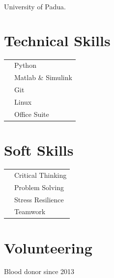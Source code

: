 \documentclass[a4paper, 12pt]{my_cv}
\newlength\MyColWidth
\newlength\SideWidth
\begin{document}
\begin{textblock*}{\SideWidth}
{    
    \raggedright University of Padua.
    
    }

\section*{Technical Skills}
    \begin{tabu} to 0.9
              & Python\\ 
              & Matlab \& Simulink\\ 
              & Git\\ 
              & Linux\\
              & Office Suite\\
    \end{tabu}

    \section*{Soft Skills}
    \begin{tabu} to 0.9
                  & Critical Thinking\\ 
              & Problem Solving\\
              & Stress Resilience\\
              & Teamwork
    \end{tabu}

    \section*{Volunteering}
    Blood donor since 2013
\end{textblock*}
\end{document}
